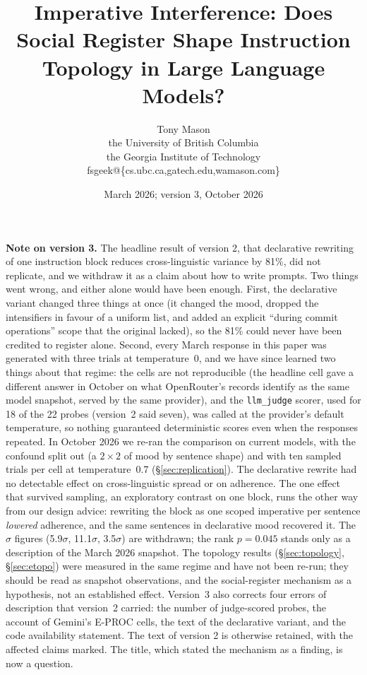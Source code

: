 \documentclass[11pt,a4paper]{article}
\title{\textbf{Imperative Interference: Does Social Register Shape Instruction Topology in Large Language Models?}}
\author{Tony Mason \\
the University of British Columbia \\
the Georgia Institute of Technology \\
fsgeek@\{cs.ubc.ca,gatech.edu,wamason.com\}}
\date{March 2026; version 3, October 2026}
\begin{document}
\maketitle

\noindent\textbf{Note on version 3.}\enspace
The headline result of version 2, that declarative rewriting of one
instruction block reduces cross-linguistic variance by 81\%, did not
replicate, and we withdraw it as a claim about how to write prompts.
Two things went wrong, and either alone would have been enough. First,
the declarative variant changed three things at once (it changed the
mood, dropped the intensifiers in favour of a uniform list, and added
an explicit ``during commit operations'' scope that the original
lacked), so the 81\% could never have been credited to register alone.
Second, every March response in this paper was generated with three
trials at temperature~0, and we have since learned two things about
that regime: the cells are not reproducible (the headline cell gave a
different answer in October on what OpenRouter's records identify as
the same model snapshot, served by the same provider), and the
\texttt{llm\_judge} scorer, used for 18 of the 22 probes (version~2
said seven), was called at the provider's default temperature, so nothing
guaranteed deterministic scores even when the responses repeated. In
October 2026 we re-ran the comparison on current models,
with the confound split out (a $2\times2$ of mood by sentence shape)
and with ten sampled trials per cell at temperature~0.7
(\S\ref{sec:replication}). The declarative rewrite had no detectable
effect on cross-linguistic spread or on adherence. The one effect that
survived sampling, an exploratory contrast on one block, runs the
other way from our design advice: rewriting the block as one scoped
imperative per sentence \emph{lowered} adherence, and the same
sentences in declarative mood recovered it. The $\sigma$ figures
(5.9$\sigma$, 11.1$\sigma$, 3.5$\sigma$) are withdrawn; the rank
$p = 0.045$ stands only as a description of the March 2026 snapshot.
The topology results (\S\ref{sec:topology}, \S\ref{sec:etopo}) were
measured in the same regime and have not been re-run; they should be
read as snapshot observations, and the social-register mechanism as a
hypothesis, not an established effect. Version~3 also corrects four
errors of description that version~2 carried: the number of
judge-scored probes, the account of Gemini's E-PROC cells, the text of
the declarative variant, and the code availability statement. The text
of version 2 is otherwise retained, with the affected claims marked. The title, which stated the mechanism as a finding, is
now a question.
\end{document}

